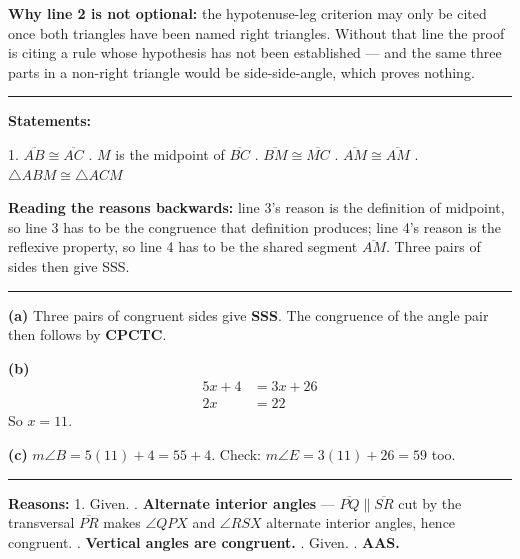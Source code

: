 \documentclass[12pt]{article}
\begin{document}
\textbf{Why line 2 is not optional:} the hypotenuse-leg criterion may only be cited once both triangles have been named right triangles. Without that line the proof is citing a rule whose hypothesis has not been established --- and the same three parts in a non-right triangle would be side-side-angle, which proves nothing.

\vspace{0.2cm}\noindent\rule{\linewidth}{0.2pt}


\textbf{Statements:}

1. $\overline{AB} \cong \overline{AC}$ . $M$ is the midpoint of $\overline{BC}$ . $\overline{BM} \cong \overline{MC}$ . $\overline{AM} \cong \overline{AM}$ . $\triangle ABM \cong \triangle ACM$

\textbf{Reading the reasons backwards:} line 3's reason is the definition of midpoint, so line 3 has to be the congruence that definition produces; line 4's reason is the reflexive property, so line 4 has to be the shared segment $\overline{AM}$. Three pairs of sides then give SSS.

\vspace{0.2cm}\noindent\rule{\linewidth}{0.2pt}


\textbf{(a)} Three pairs of congruent sides give \textbf{SSS}. The congruence of the angle pair then follows by \textbf{CPCTC}.

\textbf{(b)}
\begin{align*}
  5x + 4 &= 3x + 26 \\
  2x &= 22
\end{align*}
So $x = 11$. 

\textbf{(c)} $m\angle B = 5(11) + 4 = 55 + 4$. Check: $m\angle E = 3(11) + 26 = 59$ too. 

\vspace{0.2cm}\noindent\rule{\linewidth}{0.2pt}


\textbf{Reasons:} 1. Given. . \textbf{Alternate interior angles} --- $\overline{PQ} \parallel \overline{SR}$ cut by the transversal $\overline{PR}$ makes $\angle QPX$ and $\angle RSX$ alternate interior angles, hence congruent. . \textbf{Vertical angles are congruent.} . Given. . \textbf{AAS.}
\end{document}
